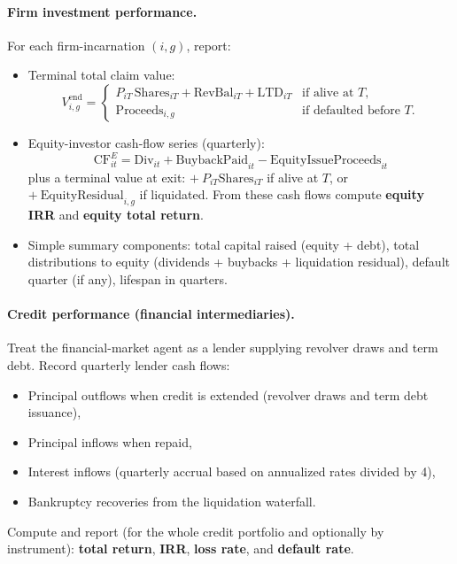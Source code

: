 \documentclass[11pt]{article}
\begin{document}
\paragraph{Firm investment performance.}
For each firm-incarnation $(i,g)$, report:
\begin{itemize}[leftmargin=*]
    \item Terminal total claim value:
    \[
    V^{\text{end}}_{i,g}=
    \begin{cases}
    P_{iT}\,\text{Shares}_{iT} + \text{RevBal}_{iT}+\text{LTD}_{iT} & \text{if alive at }T,\\
    \text{Proceeds}_{i,g} & \text{if defaulted before }T.
    \end{cases}
    \]
    \item Equity-investor cash-flow series (quarterly): 
    \[
    \text{CF}^{E}_{it}= \text{Div}_{it}+\text{BuybackPaid}_{it}-\text{EquityIssueProceeds}_{it}
    \]
    plus a terminal value at exit:
    $+\ P_{iT}\text{Shares}_{iT}$ if alive at $T$, or $+\ \text{EquityResidual}_{i,g}$ if liquidated.
    From these cash flows compute \textbf{equity IRR} and \textbf{equity total return}.
    \item Simple summary components: total capital raised (equity + debt), total distributions to equity (dividends + buybacks + liquidation residual), default quarter (if any), lifespan in quarters.
\end{itemize}

\paragraph{Credit performance (financial intermediaries).}
Treat the financial-market agent as a lender supplying revolver draws and term debt. Record quarterly lender cash flows:
\begin{itemize}[leftmargin=*]
    \item Principal outflows when credit is extended (revolver draws and term debt issuance),
    \item Principal inflows when repaid,
    \item Interest inflows (quarterly accrual based on annualized rates divided by 4),
    \item Bankruptcy recoveries from the liquidation waterfall.
\end{itemize}
Compute and report (for the whole credit portfolio and optionally by instrument):
\textbf{total return}, \textbf{IRR}, \textbf{loss rate}, and \textbf{default rate}.
\end{document}
